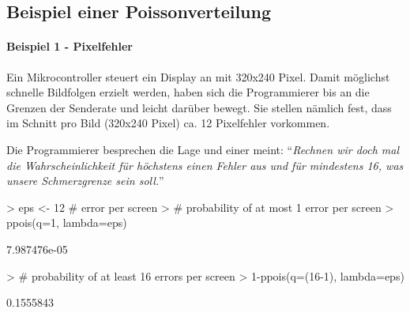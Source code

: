 \clearpage

\subsection{Beispiel einer Poissonverteilung}

\paragraph{Beispiel 1 - Pixelfehler}
Ein \gls{Mikrocontroller} steuert ein Display an mit 320x240 
\gls{Pixel}. Damit möglichst schnelle Bildfolgen erzielt werden, 
haben sich die Programmierer bis an die Grenzen der Senderate und 
leicht darüber bewegt. Sie stellen nämlich fest, dass im Schnitt 
pro Bild (320x240 Pixel) ca. 12 Pixelfehler vorkommen.

Die Programmierer besprechen die Lage und einer meint: 
"`\emph{Rechnen wir doch mal die Wahrscheinlichkeit für höchstens 
einen Fehler aus und für mindestens 16, was unsere Schmerzgrenze 
sein soll.}"'

\begin{Schunk}
\begin{Sinput}
> eps <- 12 # error per screen
> # probability of at most 1 error per screen
> ppois(q=1, lambda=eps)
\end{Sinput}
\begin{Soutput}
[1] 7.987476e-05
\end{Soutput}
\begin{Sinput}
> # probability of at least 16 errors per screen
> 1-ppois(q=(16-1), lambda=eps)
\end{Sinput}
\begin{Soutput}
[1] 0.1555843
\end{Soutput}
\end{Schunk}




